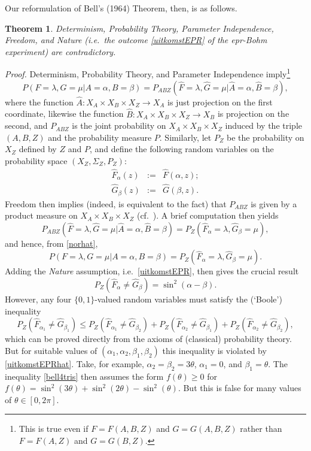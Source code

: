 \documentclass[11pt]{article}
\newtheorem{Theorem}[Definition]{Theorem}
\newcommand{\epr}{{\sc epr}}
\renewcommand{\L}{\label}
\newcommand{\beq}{\begin{equation}}
\newcommand{\eeq}{\end{equation}}
\newcommand{\raw}{\rightarrow} \newcommand{\rat}{\mapsto}
\newcommand{\x}{\times} \newcommand{\hb}{\hbar}
\newcommand{\er}{\eqref}
\newcommand{\al}{\alpha} \newcommand{\bt}{L\beta}
\newcommand{\lm}{\lambda} \newcommand{\Lm}{\Lambda}
\newcommand{\Sg}{\Sigma} \newcommand{\ta}{\tau} \newcommand{\ph}{\phi}
\renewcommand{\L}{\label}
\begin{document}
Our reformulation of Bell's (1964) Theorem, then, is as follows.
\begin{Theorem}\label{Bell1964}
Determinism, Probability Theory,  Parameter Independence, Freedom, and Nature (i.e.\ the outcome \er{uitkomstEPR} of the \epr-Bohm experiment) are contradictory.
\end{Theorem}
\emph{Proof.} Determinism, Probability Theory, and Parameter Independence imply\footnote{This is true even if $F=F(A,B,Z)$ and $G=G(A,B,Z)$ rather than $F=F(A,Z)$ and $G=G(B,Z)$.}
\begin{equation}
P(F=\lm,G=\mu|A=\al,B=\beta)=P_{ABZ}(\hat{F}=\lm,\hat{G}=\mu|\hat{A}=\al,\hat{B}=\beta),\label{norhat}
\end{equation}
where the function $\hat{A}:X_A \x X_B\x X_Z\raw X_A$ is just projection on the first coordinate, likewise the function $\hat{B}: X_A \x X_B\x X_Z\raw X_B$ is  projection on the second, and 
 $P_{ABZ}$ is the joint probability on $X_A \x X_B\x X_Z$ induced by the triple $(A,B,Z)$ and the probability measure $P$.
 Similarly, let $P_Z$ be the probability on $X_Z$ defined by $Z$ and $P$, and 
  define the following random variables on the probability space $(X_Z,\Sg_Z,P_Z)$:
\begin{eqnarray}
\hat{F}_{\al}(z)&:=& \hat{F}(\al,z);\label{hatFalbeta}\\
\hat{G}_{\beta}(z)&:=& \hat{G}(\beta,z).\label{hatGalbeta}
\end{eqnarray}
 Freedom then implies (indeed, is equivalent to the fact) that  $P_{ABZ}$ is given by a product measure on  $X_A \x X_B\x X_Z$ (cf.\ \cite[Lemma 3.10]{Kallenberg}). A brief computation then yields
  \begin{equation}
P_{ABZ}(\hat{F}=\lm,\hat{G}=\mu|\hat{A}=\al,\hat{B}=\beta)=P_Z(\hat{F}_{\al}=\lm,\hat{G}_{\beta}=\mu),
\end{equation}
and hence, from \er{norhat}, 
 \begin{equation}
 P(F=\lm,G=\mu|A=\al,B=\beta)=P_Z(\hat{F}_{\al}=\lm,\hat{G}_{\beta}=\mu).\label{crux2bis}
\end{equation}
Adding the \emph{Nature} assumption, i.e.\ \er{uitkomstEPR},  then gives the crucial result
\begin{equation}
P_Z(\hat{F}_{\al}\neq \hat{G}_{\beta})=\sin^2(\al-\beta).\label{uitkomstEPRhat}
\end{equation}
However, any four $\{0,1\}$-valued random variables must satisfy the (`Boole') inequality \cite{Pitowsky}
\beq P_Z(\hat{F}_{\al_1}\neq \hat{G}_{\beta_1})\leq P_Z(\hat{F}_{\al_1}\neq \hat{G}_{\beta_2})+P_Z(\hat{F}_{\al_2}\neq \hat{G}_{\beta_1})+P_Z(\hat{F}_{\al_2}\neq \hat{G}_{\beta_2}), \L{bell4tris} \eeq
which can be  proved directly from the axioms of (classical) probability theory. But for  suitable values of $(\al_1,\al_2,\beta_1,\beta_2)$ this inequality is violated by \er{uitkomstEPRhat}. Take, for example,  $\al_2=\beta_2=3\theta$, $\al_1=0$, and $\beta_1=\theta$. The inequality \er{bell4tris} then assumes the form $f(\theta)\geq 0$ for $f(\theta)=\sin^2(3\theta)+\sin^2(2\theta)-\sin^2(\theta)$. But this is false for many values of $\theta\in[0,2\pi]$.
 \enp
 
\end{document}
